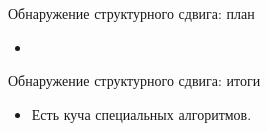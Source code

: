 
\begin{frame} %


\end{frame}



\begin{frame}{Обнаружение структурного сдвига: план}
  \begin{itemize}[<+->]
    \item 
  \end{itemize}

\end{frame}




\begin{frame}{Обнаружение структурного сдвига: итоги}

  \begin{itemize}[<+->]
    \item Есть \alert{куча} специальных алгоритмов. 
 \end{itemize}
\end{frame}

